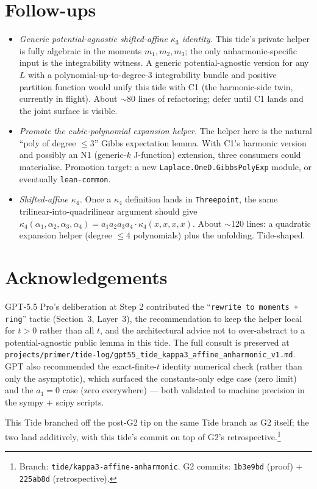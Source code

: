 \documentclass[11pt]{article}
\begin{document}
\section{Follow-ups}

\begin{itemize}
\item \emph{Generic potential-agnostic shifted-affine $\kappa_3$
  identity.} This tide's private helper is fully algebraic in the
  moments $m_1, m_2, m_3$; the only anharmonic-specific input is the
  integrability witness. A generic potential-agnostic version for any
  $L$ with a polynomial-up-to-degree-3 integrability bundle and
  positive partition function would unify this tide with C1 (the
  harmonic-side twin, currently in flight). About $\sim$80 lines of
  refactoring; defer until C1 lands and the joint surface is visible.
\item \emph{Promote the cubic-polynomial expansion helper.} The
  helper here is the natural ``poly of degree $\leq 3$'' Gibbs
  expectation lemma. With C1's harmonic version and possibly an
  N1 (generic-$k$ J-function) extension, three consumers could
  materialise. Promotion target: a new
  \texttt{Laplace.OneD.GibbsPolyExp} module, or eventually
  \texttt{lean-common}.
\item \emph{Shifted-affine $\kappa_4$.} Once a $\kappa_4$ definition
  lands in \texttt{Threepoint}, the same trilinear-into-quadrilinear
  argument should give
  $\kappa_4(\alpha_1, \alpha_2, \alpha_3, \alpha_4) = a_1 a_2 a_3 a_4
  \cdot \kappa_4(x, x, x, x)$. About $\sim$120 lines: a quadratic
  expansion helper (degree $\leq 4$ polynomials) plus the unfolding.
  Tide-shaped.
\end{itemize}

\section*{Acknowledgements}

GPT-5.5 Pro's deliberation at Step 2 contributed the
``\texttt{rewrite to moments + ring}'' tactic (Section~3, Layer~3),
the recommendation to keep the helper local for $t > 0$ rather than
all $t$, and the architectural advice not to over-abstract to a
potential-agnostic public lemma in this tide. The full consult is
preserved at
\texttt{projects/primer/tide-log/gpt55\_tide\_kappa3\_affine\_anharmonic\_v1.md}.
GPT also recommended the exact-finite-$t$ identity numerical check
(rather than only the asymptotic), which surfaced the
constants-only edge case (zero limit) and the $a_1 = 0$ case (zero
everywhere) — both validated to machine precision in the sympy +
scipy scripts.

This Tide branched off the post-G2 tip on the same Tide branch as
G2 itself; the two land additively, with this tide's commit on top
of G2's retrospective.\footnote{Branch:
\texttt{tide/kappa3-affine-anharmonic}. G2 commits:
\texttt{1b3e9bd} (proof) + \texttt{225ab8d} (retrospective).}
\end{document}
